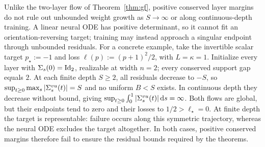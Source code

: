 \begin{remark}
\label{rem:resnet-path-escape}
Unlike the two-layer flow of Theorem~\ref{thm:gf}, positive conserved
layer margins do not rule out unbounded weight growth as $S\to\infty$
or along continuous-depth training. A linear neural ODE has positive
determinant, so it cannot fit an orientation-reversing target; training
may instead approach a singular endpoint through unbounded residuals.
For a concrete example, take the invertible scalar target $p_\star:=-1$ and loss
$\ell(p):=(p+1)^2/2$, with $L=\kappa=1$. Initialize every layer with
$\Sigma_s(0)=\mathrm{Id}_2$, realizable at width $n=2$; every conserved support
gap equals $2$. At each finite depth $S\ge2$, all residuals decrease
to $-S$, so $\sup_{t\ge0}\max_s|\Sigma^{vu}_s(t)|=S$ and no uniform $B<S$
exists. In continuous depth they decrease without bound, giving
$\sup_{t\ge0}\int_0^1|\Sigma^{vu}_s(t)|\,\mathrm{d} s=\infty$.
Both flows are global, but their endpoints tend to zero and their losses
to $1/2>\ell_\star=0$. At finite depth the target is representable:
failure occurs along this symmetric trajectory, whereas the neural ODE
excludes the target altogether. In both cases, positive conserved margins
therefore fail to ensure the residual bounds required by the theorems.
\end{remark}

